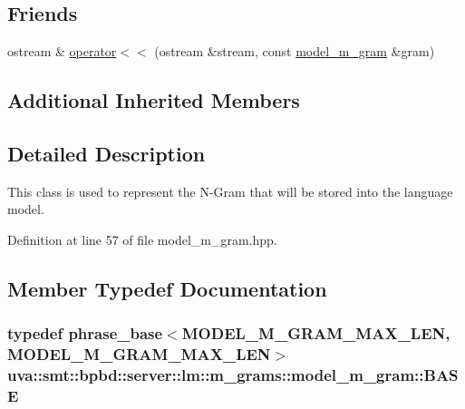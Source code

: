 \subsection*{Friends}
\begin{DoxyCompactItemize}
\item 
ostream \& \hyperlink{classuva_1_1smt_1_1bpbd_1_1server_1_1lm_1_1m__grams_1_1model__m__gram_a88dcc7add3f2f6872e082e68d7cd88a2}{operator$<$$<$} (ostream \&stream, const \hyperlink{classuva_1_1smt_1_1bpbd_1_1server_1_1lm_1_1m__grams_1_1model__m__gram}{model\+\_\+m\+\_\+gram} \&gram)
\end{DoxyCompactItemize}
\subsection*{Additional Inherited Members}


\subsection{Detailed Description}
This class is used to represent the N-\/\+Gram that will be stored into the language model. 

Definition at line 57 of file model\+\_\+m\+\_\+gram.\+hpp.



\subsection{Member Typedef Documentation}
\hypertarget{classuva_1_1smt_1_1bpbd_1_1server_1_1lm_1_1m__grams_1_1model__m__gram_a4089a31decb5c2b1afe81e02043543c7}{}
\subsubsection[{B\+A\+S\+E}]{\setlength{\rightskip}{0pt plus 5cm}typedef {\bf phrase\+\_\+base}$<$M\+O\+D\+E\+L\+\_\+\+M\+\_\+\+G\+R\+A\+M\+\_\+\+M\+A\+X\+\_\+\+L\+E\+N, M\+O\+D\+E\+L\+\_\+\+M\+\_\+\+G\+R\+A\+M\+\_\+\+M\+A\+X\+\_\+\+L\+E\+N$>$ {\bf uva\+::smt\+::bpbd\+::server\+::lm\+::m\+\_\+grams\+::model\+\_\+m\+\_\+gram\+::\+B\+A\+S\+E}}\label{classuva_1_1smt_1_1bpbd_1_1server_1_1lm_1_1m__grams_1_1model__m__gram_a4089a31decb5c2b1afe81e02043543c7}


